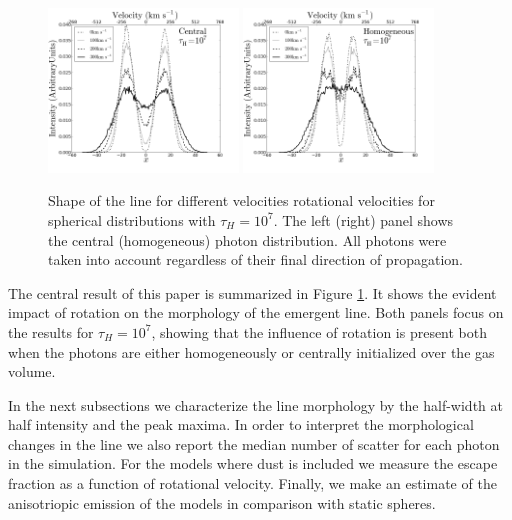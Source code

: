 \documentclass{emulateapj}
\newcommand{\ly}{{\ifmmode{{\rm Ly}\alpha~}\else{Ly$\alpha$~}\fi}}
\begin{document}
\begin{figure}
\begin{center}
  \includegraphics[width=0.45\textwidth]{SpectraDifVelocitiesCentral.png}
  \includegraphics[width=0.45\textwidth]{SpectraDifVelocitiesHOM.png}
\end{center}
\caption{Shape of the \ly line for
    different velocities rotational velocities for spherical
    distributions with $\tau_{H}=10^{7}$. The left (right) panel shows
    the central (homogeneous) photon distribution. All photons were
    taken into  account regardless of their final direction of propagation.
    \label{fig:differentvelocities}}  
\end{figure}

The central result of this paper is summarized in Figure
\ref{fig:differentvelocities}. It shows the evident
impact of rotation on the morphology of the emergent \ly line. Both
panels focus on the results for $\tau_{H}=10^{7}$, showing that the
influence of rotation is present both when the photons are either
homogeneously or centrally initialized over the gas volume.  

In the next subsections we characterize the line morphology by
the half-width at half intensity and the peak maxima. In order to
interpret the morphological changes in the line we also report the
median number of scatter for each \ly photon in the
simulation. For the models where dust is included we measure the 
escape fraction as a function of rotational velocity. Finally, we make
an estimate of the anisotriopic emission of the models in comparison
with static spheres.
\end{document}
